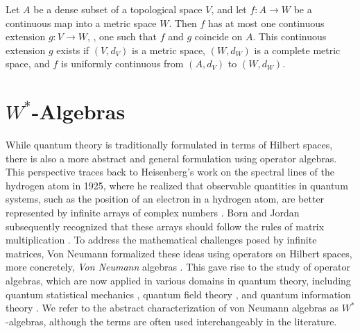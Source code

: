 \begin{lemma} \cite[Lemma 7.3.19]{goubault-larrecqNonHausdorffTopologyDomain2013}  \label{lem:completion_unique}
Let \( A \) be a dense subset of a topological space \( V \), and let  
\( f: A \to W \) be a continuous map into a metric space \( W \).  
Then \( f \) has at most one continuous extension \( g: V \to W \), \ie, one such that $f$ and $g$ coincide on $A$.  
This continuous extension \( g \) exists if \( (V,d_V) \) is a metric space, \( (W,d_W) \) is a complete metric space, and \( f \) is uniformly continuous from \( (A,d_V) \) to \( (W,d_W) \). 
\end{lemma}




\section{\( W^* \)-Algebras}

 While quantum theory is traditionally formulated in terms of Hilbert spaces, there is also a more abstract and general formulation using operator algebras. This perspective traces back to Heisenberg’s work on the spectral lines of the hydrogen atom in 1925, where he realized that observable quantities in quantum systems, such as the position of an electron in a hydrogen atom, are better represented by infinite arrays of complex numbers \cite{heisenbergUeberQuantentheoretischeUmdeutung1925}. Born and Jordan subsequently recognized that these arrays should follow the rules of matrix multiplication \cite{bornZurQuantenmechanik1925}. To address the mathematical challenges posed by infinite matrices, Von Neumann formalized these ideas using operators on Hilbert spaces, more concretely, \emph{Von Neumann} algebras \cite{neumann1927wahrscheinlichkeitstheoretischer}. This gave rise to the study of operator algebras, which are now applied in various domains in quantum theory, including quantum statistical mechanics \cite{bratteliOperatorAlgebrasQuantum1987}, quantum field theory \cite{arakiMathematicalTheoryQuantum1999,haagAlgebraicApproachQuantum1964}, and quantum information theory \cite{keylFundamentalsQuantumInformation2002}. We refer to the abstract characterization of von Neumann algebras as $W^*$-algebras, although the terms are often used interchangeably in the literature.


